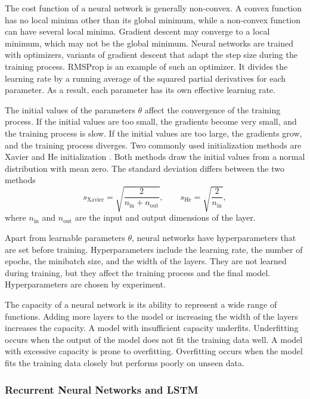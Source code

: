 The cost function of a neural network is generally non-convex. A convex function has no local minima other than its global minimum, while a non-convex function can have several local minima. Gradient descent may converge to a local minimum, which may not be the global minimum. Neural networks are trained with optimizers, variants of gradient descent that adapt the step size during the training process. RMSProp is an example of such an optimizer. It divides the learning rate by a running average of the squared partial derivatives for each parameter. As a result, each parameter has its own effective learning rate. 

The initial values of the parameters $\theta$ affect the convergence of the training process. If the initial values are too small, the gradients become very small, and the training process is slow. If the initial values are too large, the gradients grow, and the training process diverges. Two commonly used initialization methods are Xavier \parencite{glorotUnderstandingDifficultyTraining2010} and He initialization \parencite{heDelvingDeepRectifiers2015}. Both methods draw the initial values from a normal distribution with mean zero. The standard deviation differs between the two methods
\begin{equation}
s_{\text{Xavier}} = \sqrt{\frac{2}{n_{\text{in}} + n_{\text{out}}}}, \qquad
s_{\text{He}} = \sqrt{\frac{2}{n_{\text{in}}}},
\end{equation}
where $n_{\text{in}}$ and $n_{\text{out}}$ are the input and output dimensions of the layer.

Apart from learnable parameters $\theta$, neural networks have hyperparameters that are set before training. Hyperparameters include the learning rate, the number of epochs, the minibatch size, and the width of the layers. They are not learned during training, but they affect the training process and the final model. Hyperparameters are chosen by experiment. 

The capacity of a neural network is its ability to represent a wide range of functions. Adding more layers to the model or increasing the width of the layers increases the capacity. A model with insufficient capacity underfits. Underfitting occurs when the output of the model does not fit the training data well. A model with excessive capacity is prone to overfitting. Overfitting occurs when the model fits the training data closely but performs poorly on unseen data.

\subsubsection{Recurrent Neural Networks and LSTM}\label{sec:rnn}

